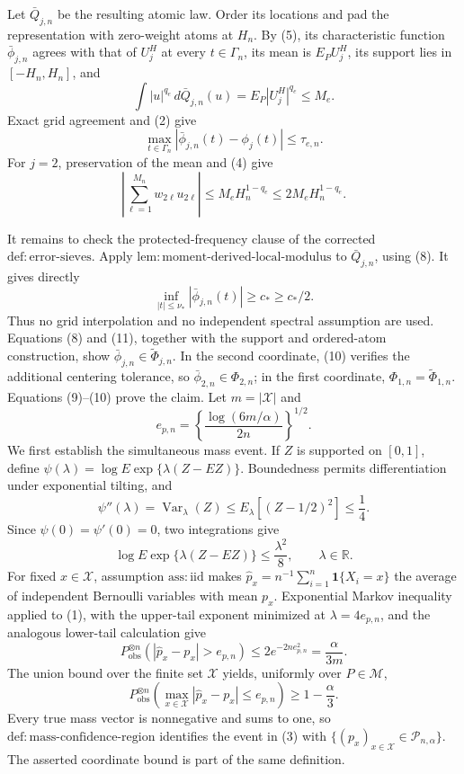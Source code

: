 Let \(\bar Q_{j,n}\) be the resulting atomic law.  Order its locations and
pad the representation with zero-weight atoms at \(H_n\).  By (5), its
characteristic function \(\bar\phi_{j,n}\) agrees with that of \(U_j^H\) at
every \(t\in\Gamma_n\), its mean is \(E_PU_j^H\), its support lies in
\([-H_n,H_n]\), and
\[
 \int|u|^{q_e}\,d\bar Q_{j,n}(u)
 =E_P|U_j^H|^{q_e}\le M_e.                                        \tag{8}
\]
Exact grid agreement and (2) give
\[
 \max_{t\in\Gamma_n}|\bar\phi_{j,n}(t)-\phi_j(t)|
 \le\tau_{e,n}.                                                    \tag{9}
\]
For \(j=2\), preservation of the mean and (4) give
\[
 \left|\sum_{\ell=1}^{M_n}w_{2\ell}u_{2\ell}\right|
 \le M_eH_n^{1-q_e}
 \le2M_eH_n^{1-q_e}.                                               \tag{10}
\]

It remains to check the protected-frequency clause of the corrected
\(\mathrm{def{:}error\text{-}sieves}\).  Apply
\(\mathrm{lem{:}moment\text{-}derived\text{-}local\text{-}modulus}\) to
\(\bar Q_{j,n}\), using (8).  It gives directly
\[
 \inf_{|t|\le\nu_*}|\bar\phi_{j,n}(t)|\ge c_*\ge c_*/2.            \tag{11}
\]
Thus no grid interpolation and no independent spectral assumption are used.
Equations (8) and (11), together with the support and ordered-atom
construction, show \(\bar\phi_{j,n}\in\widetilde\Phi_{j,n}\).  In the
second coordinate, (10) verifies the additional centering tolerance, so
\(\bar\phi_{2,n}\in\Phi_{2,n}\); in the first coordinate,
\(\Phi_{1,n}=\widetilde\Phi_{1,n}\).  Equations (9)--(10) prove the claim.
Let \(m=|\mathcal X|\) and
\[
 e_{p,n}=\left\{\frac{\log(6m/\alpha)}{2n}\right\}^{1/2}.
\]
We first establish the simultaneous mass event.  If \(Z\) is supported on
\([0,1]\), define
\(\psi(\lambda)=\log E\exp\{\lambda(Z-EZ)\}\).  Boundedness permits
differentiation under exponential tilting, and
\[
 \psi''(\lambda)=\operatorname{Var}_{\lambda}(Z)
 \le E_{\lambda}[(Z-1/2)^2]\le\frac14.
\]
Since \(\psi(0)=\psi'(0)=0\), two integrations give
\[
 \log E\exp\{\lambda(Z-EZ)\}\le\frac{\lambda^2}{8},
 \qquad \lambda\in\mathbb R.                                     \tag{1}
\]
For fixed \(x\in\mathcal X\), assumption \(\mathrm{ass{:}iid}\) makes
\(\widehat p_x=n^{-1}\sum_{i=1}^n\mathbf1\{X_i=x\}\) the average of
independent Bernoulli variables with mean \(p_x\).  Exponential Markov
inequality applied to (1), with the upper-tail exponent minimized at
\(\lambda=4e_{p,n}\), and the analogous lower-tail calculation give
\[
 P_{\mathrm{obs}}^{\otimes n}
 (|\widehat p_x-p_x|>e_{p,n})
 \le2e^{-2ne_{p,n}^2}=\frac{\alpha}{3m}.                           \tag{2}
\]
The union bound over the finite set \(\mathcal X\) yields, uniformly over
\(P\in\mathcal M\),
\[
 P_{\mathrm{obs}}^{\otimes n}
 \left(\max_{x\in\mathcal X}|\widehat p_x-p_x|\le e_{p,n}\right)
 \ge1-\frac\alpha3.                                                \tag{3}
\]
Every true mass vector is nonnegative and sums to one, so
\(\mathrm{def{:}mass\text{-}confidence\text{-}region}\) identifies the
event in (3) with
\(\{(p_x)_{x\in\mathcal X}\in\mathcal P_{n,\alpha}\}\).  The asserted
coordinate bound is part of the same definition.

